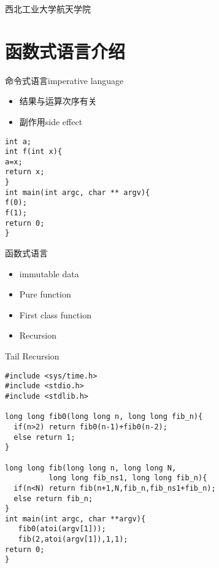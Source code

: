 

\def\lecturename{嵌入式技术}

\title{\insertlecture}

\author{邢超}

\institute
{
  西北工业大学航天学院
}


\subtitle{函数式程序设计}
\date{2012}



\begin{frame}
  \maketitle
\end{frame}


\section{函数式语言介绍}
\begin{frame}[containsverbatim]{命令式语言imperative language}
\begin{itemize}
\item 结果与运算次序有关
\item 副作用side effect
\end{itemize}
\begin{lstlisting}
int a;
int f(int x){
a=x;
return x;
}
int main(int argc, char ** argv){
f(0);
f(1);
return 0;
}
\end{lstlisting}
\end{frame}

\begin{frame}{函数式语言}
\begin{itemize}
\item immutable data
\item Pure function
\item First class function
\item Recursion
\end{itemize}
\end{frame}

\begin{frame}[containsverbatim]{Tail Recursion}
\begin{lstlisting}
#include <sys/time.h>
#include <stdio.h>
#include <stdlib.h>

long long fib0(long long n, long long fib_n){
  if(n>2) return fib0(n-1)+fib0(n-2);
  else return 1;
}

long long fib(long long n, long long N,
          long long fib_ns1, long long fib_n){
  if(n<N) return fib(n+1,N,fib_n,fib_ns1+fib_n);
  else return fib_n;
}
int main(int argc, char **argv){
   fib0(atoi(argv[1]));
   fib(2,atoi(argv[1]),1,1);
return 0;
}
\end{lstlisting}
\end{frame}

